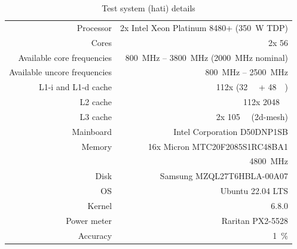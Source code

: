 \begin{table}[t]
	\centering
	\caption{\label{tab:test-system}Test system (hati) details}
	\begin{tabular}{rr}
		\toprule
		Processor	&	2x Intel Xeon Platinum 8480+ (\SI{350}{\watt} TDP)\\
		\rowcolor[HTML]{EFEFEF}Cores		&	2x 56 \\
		Available core frequencies	&	\SI{800}{\MHz} -- \SI{3800}{\MHz} (\SI{2000}{\MHz} nominal) \\
		\rowcolor[HTML]{EFEFEF}Available uncore frequencies	&	\SI{800}{\MHz} -- \SI{2500}{\MHz} \\
		L1-i and L1-d cache	&	112x (\SI{32}{\kibi\byte} + \SI{48}{\kibi\byte})\\
		\rowcolor[HTML]{EFEFEF}L2 cache	&	112x \SI{2048}{\kibi\byte} \\
		L3 cache	&	2x \SI{105}{\mebi\byte} (2d-mesh) \\
		\rowcolor[HTML]{EFEFEF}Mainboard	&	Intel Corporation D50DNP1SB \\
		Memory		&	16x Micron MTC20F2085S1RC48BA1  \\
		 &	\SI{4800}{\mega\hertz} \\
		\rowcolor[HTML]{EFEFEF}Disk		&	Samsung MZQL27T6HBLA-00A07 \\
		OS           &   Ubuntu 22.04 LTS \\
		\rowcolor[HTML]{EFEFEF} Kernel          &   6.8.0 \\
		Power meter & Raritan PX2-5528\\
		\rowcolor[HTML]{EFEFEF} Accuracy & \SI{1}{\percent}\\
		\bottomrule
	\end{tabular}
\end{table}

